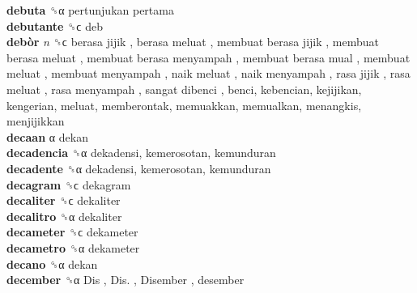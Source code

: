 \textbf{debuta} ␝α   pertunjukan pertama   \\
\textbf{debutante} ␝ϲ  deb  \\
\textbf{debòr} \emph{n}  ␝ϲ   berasa jijik ,  berasa meluat ,  membuat berasa jijik ,  membuat berasa meluat ,  membuat berasa menyampah ,  membuat berasa mual ,  membuat meluat ,  membuat menyampah ,  naik meluat ,  naik menyampah ,  rasa jijik ,  rasa meluat ,  rasa menyampah ,  sangat dibenci , benci, kebencian, kejijikan, kengerian, meluat, memberontak, memuakkan, memualkan, menangkis, menjijikkan  \\
\textbf{decaan} α  dekan  \\
\textbf{decadencia} ␝α  dekadensi, kemerosotan, kemunduran  \\
\textbf{decadente} ␝α  dekadensi, kemerosotan, kemunduran  \\
\textbf{decagram} ␝ϲ  dekagram  \\
\textbf{decaliter} ␝ϲ  dekaliter  \\
\textbf{decalitro} ␝α  dekaliter  \\
\textbf{decameter} ␝ϲ  dekameter  \\
\textbf{decametro} ␝α  dekameter  \\
\textbf{decano} ␝α  dekan  \\
\textbf{december} ␝α   Dis ,  Dis. ,  Disember , desember  \\

